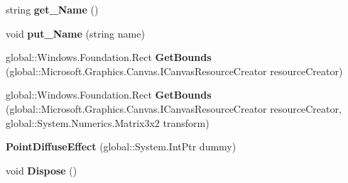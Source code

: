 \begin{DoxyCompactItemize}
\item 
\mbox{\label{class_microsoft_1_1_graphics_1_1_canvas_1_1_effects_1_1_point_diffuse_effect_a30a5168ffb6294e4382215f72ffc6c43}} 
string {\bfseries get\+\_\+\+Name} ()
\item 
\mbox{\label{class_microsoft_1_1_graphics_1_1_canvas_1_1_effects_1_1_point_diffuse_effect_a7859ce70aa004a985213e13d24077993}} 
void {\bfseries put\+\_\+\+Name} (string name)
\item 
\mbox{\label{class_microsoft_1_1_graphics_1_1_canvas_1_1_effects_1_1_point_diffuse_effect_a4ea41fe2e96af16d284ce3c8fed52889}} 
global\+::\+Windows.\+Foundation.\+Rect {\bfseries Get\+Bounds} (global\+::\+Microsoft.\+Graphics.\+Canvas.\+I\+Canvas\+Resource\+Creator resource\+Creator)
\item 
\mbox{\label{class_microsoft_1_1_graphics_1_1_canvas_1_1_effects_1_1_point_diffuse_effect_a7e675ad720b1c7fd2661be4a4e964855}} 
global\+::\+Windows.\+Foundation.\+Rect {\bfseries Get\+Bounds} (global\+::\+Microsoft.\+Graphics.\+Canvas.\+I\+Canvas\+Resource\+Creator resource\+Creator, global\+::\+System.\+Numerics.\+Matrix3x2 transform)
\item 
\mbox{\label{class_microsoft_1_1_graphics_1_1_canvas_1_1_effects_1_1_point_diffuse_effect_a339b570af9f36502e7a354c01bdefc1a}} 
{\bfseries Point\+Diffuse\+Effect} (global\+::\+System.\+Int\+Ptr dummy)
\item 
\mbox{\label{class_microsoft_1_1_graphics_1_1_canvas_1_1_effects_1_1_point_diffuse_effect_aab9fe4ed8a06cb7b338c2b768c889cc4}} 
void {\bfseries Dispose} ()
\item 
\mbox{\label{class_microsoft_1_1_graphics_1_1_canvas_1_1_effects_1_1_point_diffuse_effect_adc8bd7af80c3dba7ae3387489695b283}} 

\end{DoxyCompactItemize}
